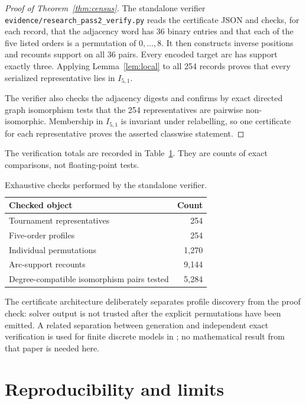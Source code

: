 \documentclass[11pt]{article}
\begin{document}
\begin{proof}[Proof of Theorem~\ref{thm:census}]
The standalone verifier
\texttt{evidence/research\_pass2\_verify.py} reads the certificate JSON and
checks, for each record, that the adjacency word has 36 binary entries and
that each of the five listed orders is a permutation of $0,\ldots,8$.  It then
constructs inverse positions and recounts support on all 36 pairs.  Every
encoded target arc has support exactly three.  Applying
Lemma~\ref{lem:local} to all 254 records proves that every serialized
representative lies in $I_{5,1}$.

The verifier also checks the adjacency digests and confirms by exact directed
graph isomorphism tests that the 254 representatives are pairwise
non-isomorphic.  Membership in $I_{5,1}$ is invariant under relabelling, so one
certificate for each representative proves the asserted classwise statement.
\end{proof}

The verification totals are recorded in Table~\ref{tab:totals}.  They are
counts of exact comparisons, not floating-point tests.

\begin{table}[ht]
\centering
\begin{tabular}{lr}
\toprule
Checked object & Count \\
\midrule
Tournament representatives & 254 \\
Five-order profiles & 254 \\
Individual permutations & 1,270 \\
Arc-support recounts & 9,144 \\
Degree-compatible isomorphism pairs tested & 5,284 \\
\bottomrule
\end{tabular}
\caption{Exhaustive checks performed by the standalone verifier.}
\label{tab:totals}
\end{table}

The certificate architecture deliberately separates profile discovery from
the proof check: solver output is not trusted after the explicit permutations
have been emitted.  A related separation between generation and independent
exact verification is used for finite discrete models in
\cite{ZengEtAl2026FiniteCertificates}; no mathematical result from that paper
is needed here.

\section{Reproducibility and limits}
\end{document}
